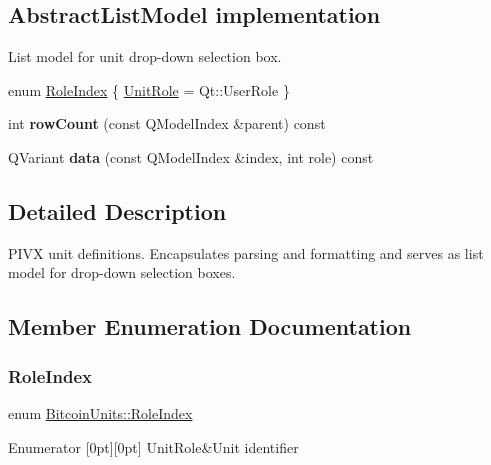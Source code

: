 \subsection*{Abstract\+List\+Model implementation}
\label{_amgrp2e845e8604997c2ca3724f5375e55564}%
 List model for unit drop-\/down selection box. \begin{DoxyCompactItemize}
\item 
enum \mbox{\hyperlink{class_bitcoin_units_a094a1a150647021c419f06a923795959}{Role\+Index}} \{ \mbox{\hyperlink{class_bitcoin_units_a094a1a150647021c419f06a923795959adba268d796f853874a3b830bb92c5c80}{Unit\+Role}} = Qt\+:\+:User\+Role
 \}
\item 
\mbox{\label{class_bitcoin_units_aa3f7476c7e9a452082977a48384d8814}} 
int {\bfseries row\+Count} (const Q\+Model\+Index \&parent) const
\item 
\mbox{\label{class_bitcoin_units_a576f4d0219a807146cf0306a824c5ef9}} 
Q\+Variant {\bfseries data} (const Q\+Model\+Index \&index, int role) const
\end{DoxyCompactItemize}


\subsection{Detailed Description}
P\+I\+VX unit definitions. Encapsulates parsing and formatting and serves as list model for drop-\/down selection boxes. 

\subsection{Member Enumeration Documentation}
\mbox{\label{class_bitcoin_units_a094a1a150647021c419f06a923795959}} 
\subsubsection{\texorpdfstring{Role\+Index}{RoleIndex}}
{\footnotesize\ttfamily enum \mbox{\hyperlink{class_bitcoin_units_a094a1a150647021c419f06a923795959}{Bitcoin\+Units\+::\+Role\+Index}}}

\begin{DoxyEnumFields}{Enumerator}
[0pt][0pt]{}\mbox{\label{class_bitcoin_units_a094a1a150647021c419f06a923795959adba268d796f853874a3b830bb92c5c80}} 
Unit\+Role&Unit identifier \\
\hline

\end{DoxyEnumFields}
\mbox{\label{class_bitcoin_units_ae41018ba530b4c8bdc74fd163709fb9d}} 
